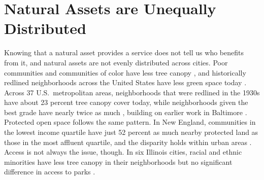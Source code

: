 \documentclass[12pt]{article}
\begin{document}
\section{Natural Assets are Unequally Distributed}\label{sec:distribution}
%
Knowing that a natural asset provides a service does not tell us who benefits from it, and natural assets are not evenly distributed across cities. Poor communities and communities of color have less tree canopy \citep{zhouSocialDisparitiesTree2013, simsTowardsEquityLand2023}, and historically redlined neighborhoods across the United States have less green space today \citep{nardoneRedlinesGreenspaceRelationship2021}. Across 37 U.S.\ metropolitan areas, neighborhoods that were redlined in the 1930s have about 23 percent tree canopy cover today, while neighborhoods given the best grade have nearly twice as much \citep{locke_residential_2020}, building on earlier work in Baltimore \citep{grove_legacy_2018}. Protected open space follows the same pattern. In New England, communities in the lowest income quartile have just 52 percent as much nearby protected land as those in the most affluent quartile, and the disparity holds within urban areas \citep{simsEnvironmentalJusticeCriteria2022}. Access is not always the issue, though. In six Illinois cities, racial and ethnic minorities have less tree canopy in their neighborhoods but no significant difference in access to parks \citep{zhouSocialDisparitiesTree2013}.
\end{document}
